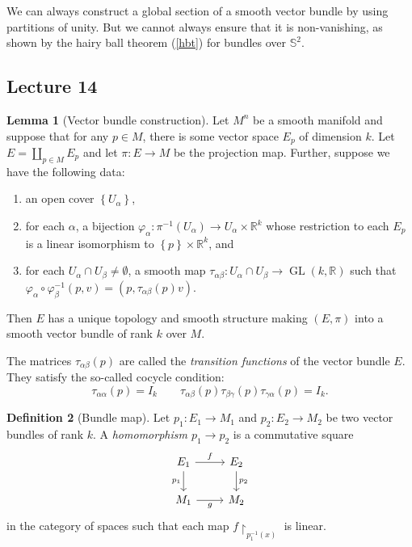 \documentclass[10pt,letterpaper,cm]{nupset}
\theoremstyle{definition}
\newtheorem{definition}{Definition}[subsection]
\theoremstyle{theorem}
\newtheorem{lemma}[definition]{Lemma}
\theoremstyle{remark}
\newcommand{\R}{\mathbb R}
\renewcommand{\S}{\mathbb S}
\newcommand{\1}{\mathbf{1}}
\newcommand{\0}{\vec 0}
\DeclareMathOperator{\GL}{GL}
\begin{document}
We can always construct a global section of a smooth vector bundle by using partitions of unity. But we cannot always ensure that it is non-vanishing, as shown by the hairy ball theorem (\cref{hbt}) for bundles over $\S^2$.


\subsection{Lecture 14}

\begin{lemma}[Vector bundle construction]
Let $M^n$ be a smooth manifold and suppose that for any $p\in M$, there is some vector space $E_p$ of dimension $k$. Let $E=  \coprod_{p\in M} E_p$ and let $\pi : E \to M$ be the projection map. Further, suppose we have the following data:
\begin{enumerate}[label=(\alph*)]
\item an open cover $\left\{U_{\alpha}\right\}$,
\item for each $\alpha$, a bijection $\varphi_{\alpha} : \pi^{-1}(U_{\alpha}) \to U_{\alpha} \times \R^k$ whose restriction to each $E_p$ is a linear isomorphism to $\left\{p\right\}\times \R^k$, and
\item for each $U_{\alpha} \cap U_{\beta} \ne \emptyset$, a smooth map $\tau_{\alpha \beta} : U_{\alpha} \cap U_{\beta} \to \GL(k , \R)$ such that $\varphi_{\alpha} \circ \varphi_{\beta}^{-1}(p, v) = \left(p, \tau_{\alpha \beta}(p)v\right)$.
\end{enumerate}
Then $E$ has a unique topology and smooth structure making $\left(E,\pi\right)$ into a smooth vector bundle of rank $k$ over $M$.
\end{lemma}

The matrices $\tau_{\alpha \beta}(p)$ are called the \textit{transition functions} of the vector bundle $E$. They satisfy the so-called cocycle condition: 
\[ \tau_{\alpha \alpha}(p) = I_k \quad \quad \tau_{\alpha \beta}(p)\tau_{\beta \gamma}(p)\tau_{\gamma \alpha}(p) = I_k.\]

\begin{definition}[Bundle map]
Let $p_1 : E_1 \to M_1$ and $p_2 : E_2 \to M_2$ be two vector bundles of rank $k$. A \textit{homomorphism $p_1 \to p_2$} is a commutative square
\[
\begin{tikzcd}
E_1 \arrow[d, "p_1"'] \arrow[r, "f"] & E_2 \arrow[d, "p_2"] \\
M_1 \arrow[r, "g"']                  & M_2                 
\end{tikzcd}
\] in the category of spaces such that each map $f\restriction_{p_1^{-1}(x)}$ is  linear. 
\end{definition}
\end{document}

